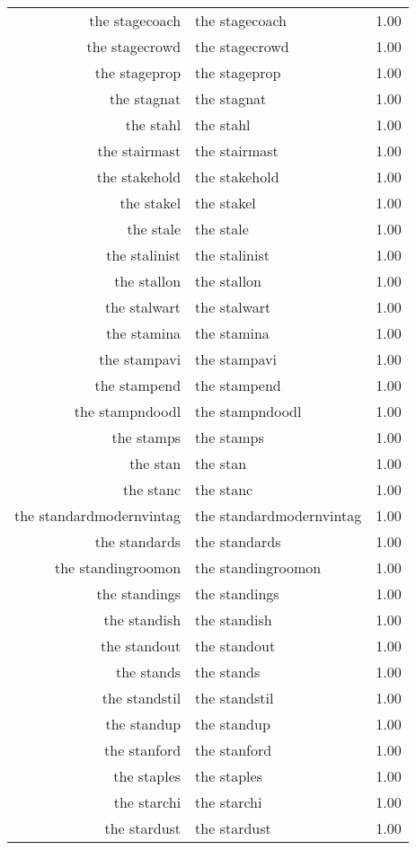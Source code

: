 \begin{table}[ht]
\begin{tabular}{rlr}
  the stagecoach & the stagecoach & 1.00 \\ 
  the stagecrowd & the stagecrowd & 1.00 \\ 
  the stageprop & the stageprop & 1.00 \\ 
  the stagnat & the stagnat & 1.00 \\ 
  the stahl & the stahl & 1.00 \\ 
  the stairmast & the stairmast & 1.00 \\ 
  the stakehold & the stakehold & 1.00 \\ 
  the stakel & the stakel & 1.00 \\ 
  the stale & the stale & 1.00 \\ 
  the stalinist & the stalinist & 1.00 \\ 
  the stallon & the stallon & 1.00 \\ 
  the stalwart & the stalwart & 1.00 \\ 
  the stamina & the stamina & 1.00 \\ 
  the stampavi & the stampavi & 1.00 \\ 
  the stampend & the stampend & 1.00 \\ 
  the stampndoodl & the stampndoodl & 1.00 \\ 
  the stamps & the stamps & 1.00 \\ 
  the stan & the stan & 1.00 \\ 
  the stanc & the stanc & 1.00 \\ 
  the standardmodernvintag & the standardmodernvintag & 1.00 \\ 
  the standards & the standards & 1.00 \\ 
  the standingroomon & the standingroomon & 1.00 \\ 
  the standings & the standings & 1.00 \\ 
  the standish & the standish & 1.00 \\ 
  the standout & the standout & 1.00 \\ 
  the stands & the stands & 1.00 \\ 
  the standstil & the standstil & 1.00 \\ 
  the standup & the standup & 1.00 \\ 
  the stanford & the stanford & 1.00 \\ 
  the staples & the staples & 1.00 \\ 
  the starchi & the starchi & 1.00 \\ 
  the stardust & the stardust & 1.00 \\ 

\end{tabular}
\end{table}
